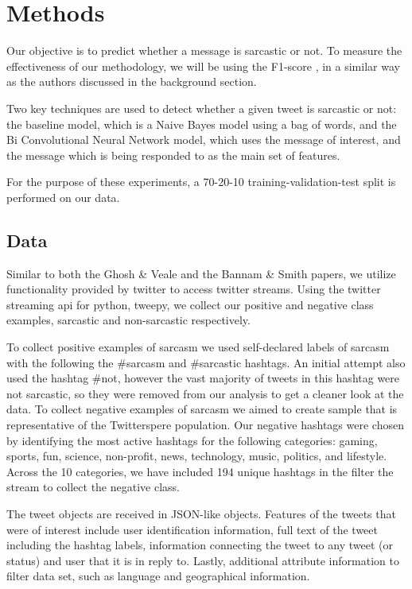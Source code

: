 \documentclass[11pt,a4paper]{article}
\begin{document}
\section{Methods}
Our objective is to predict whether a message is sarcastic or not. To measure the effectiveness of our methodology, we will be using the  F1-score , in a similar way as the authors discussed in the background section. 

Two key techniques are used to detect whether a given tweet is sarcastic or not: the baseline model, which is a Naive Bayes model using a bag of words, and the Bi Convolutional Neural Network model,  which uses the message of interest, and the message which is being responded to as the main set of features.

For the purpose of these experiments, a 70-20-10 training-validation-test split is performed on our data. 

\subsection{Data}
Similar to both the Ghosh \& Veale and the Bannam \& Smith papers, we utilize functionality provided by twitter to access twitter streams. Using the twitter streaming api for python, tweepy, we collect our positive and negative class examples, sarcastic and non-sarcastic respectively.  

To collect positive examples of sarcasm we used self-declared labels of sarcasm with the following the \#sarcasm and \#sarcastic hashtags.  An initial attempt also used the hashtag \#not, however the vast majority of tweets in this hashtag were not sarcastic, so they were removed from our analysis to get a cleaner look at the data. To collect negative examples of sarcasm we aimed to create sample that is representative of the Twitterspere population. Our negative hashtags were chosen by identifying the most active hashtags for the following categories:  gaming, sports, fun, science, non-profit, news, technology, music, politics, and lifestyle.  Across the 10 categories, we have included 194 unique hashtags in the filter the stream to collect the negative class.  

The tweet objects are received in JSON-like objects.  Features of the tweets that were of interest include user identification information, full text of the tweet including the hashtag labels, information connecting the tweet to any tweet (or status) and user that it is in reply to.  Lastly, additional attribute information to filter data set, such as language and geographical information. 
\end{document}

